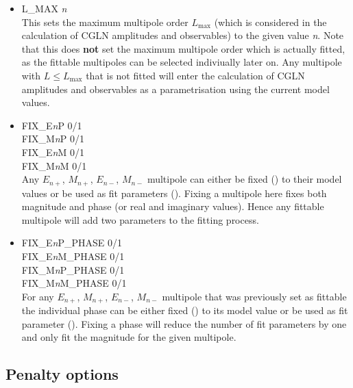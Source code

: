 \documentclass[a4paper,10pt]{article}
\def\tt{\ttfamily}
\def\rm{\rmfamily}
\begin{document}
\begin{itemize}
\item
\tt L\_MAX \textit{n}\rm\\
This sets the maximum multipole order $L_\mathrm{max}$ (which is considered in the calculation of CGLN amplitudes and observables)
to the given value \tt\textit{n}\rm.
Note that this does \textbf{not} set the maximum multipole order which is actually fitted, as the fittable multipoles
can be selected indiviually later on. Any multipole with $L \leq L_\mathrm{max}$ that is not fitted will enter
the calculation of CGLN amplitudes and observables as a parametrisation using the current model values.

\item
\tt FIX\_E\textit{n}P 0/1\rm\\
\tt FIX\_M\textit{n}P 0/1\rm\\
\tt FIX\_E\textit{n}M 0/1\rm\\
\tt FIX\_M\textit{n}M 0/1\rm\\
Any $E_{n+}$, $M_{n+}$, $E_{n-}$, $M_{n-}$ multipole can either be fixed (\tt1\rm) to their model values
or be used as fit parameters (\tt0\rm).
Fixing a multipole here fixes both magnitude and phase (or real and imaginary values).
Hence any fittable multipole will add two parameters to the fitting process.

\item
\tt FIX\_E\textit{n}P\_PHASE 0/1\rm\\
\tt FIX\_E\textit{n}M\_PHASE 0/1\rm\\
\tt FIX\_M\textit{n}P\_PHASE 0/1\rm\\
\tt FIX\_M\textit{n}M\_PHASE 0/1\rm\\
For any $E_{n+}$, $M_{n+}$, $E_{n-}$, $M_{n-}$ multipole that was previously set as fittable the individual
phase can be either fixed (\tt1\rm) to its model value or be used as fit parameter (\tt0\rm). Fixing a phase
will reduce the number of fit parameters by one and only fit the magnitude for the given multipole.

\end{itemize}

\subsection{Penalty options}
\end{document}

